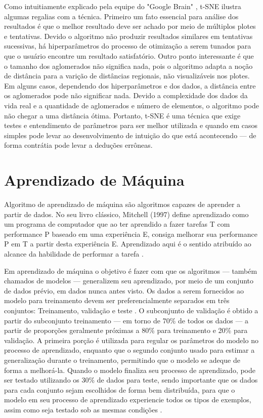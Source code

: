 \documentclass[12pt]{report}
\begin{document}
Como intuitiamente explicado pela equipe do "Google Brain" \cite{distill}, t-SNE ilustra algumas regalias com a técnica. Primeiro um fato essencial para análise dos resultados é que o melhor resultado deve ser achado por meio de múltiplos plotes e tentativas. Devido o algoritmo não produzir resultados similares em tentativas sucessivas, há hiperparâmetros do processo de otimização a serem tunados para que o usuário encontre um resultado satisfatório. Outro ponto interessante é que o tamanho dos aglomerados não significa nada, pois o algoritmo adapta a noção de distância para a varição de distâncias regionais, não visualizáveis nos plotes. Em alguns casos, dependendo dos hiperparâmetros e dos dados, a distância entre os aglomerados pode não significar nada. Devido a complexidade dos dados da vida real e a quantidade de aglomerados e número de elementos, o algoritmo pode não chegar a uma distância ótima. Portanto, t-SNE é uma técnica que exige testes e entendimento de parâmetros para ser melhor utilizada e quando em casos simples pode levar ao desenvolvimento de intuição do que está acontecendo ---  de forma contrátia pode levar a deduções errôneas.

\section{Aprendizado de Máquina}

Algoritmo de aprendizado de máquina são algoritmos capazes de aprender a partir de dados. No seu livro clássico, Mitchell (1997) define aprendizado como um programa de computador que ao ter aprendido a fazer tarefas T com performance P baseado em uma experiência E, consiga melhorar sua performance P em T a partir desta experiência E. Aprendizado aqui é o sentido atribuído ao alcance da habilidade de performar a tarefa \cite{Goodfellow}.

Em aprendizado de máquina o objetivo é fazer com que os algoritmos --- também chamados de modelos --- generalizem seu aprendizado, por meio de um conjunto de dados prévio, em dados nunca antes visto. Os dados a serem fornecidos ao modelo para treinamento devem ser preferencialmente separados em três conjuntos: Treinamento, validação e teste \cite{chollet}. O subconjunto de validação é obtido a partir do subconjunto treinamento --- em torno de 70\% de todos os dados ---  a partir de proporções geralmente próximas a 80\% para treinamento e 20\% para validação. A primeira porção é utilizada para regular os parâmetros do modelo no processo de aprendizado, enquanto que o segundo conjunto usado para estimar a generalização durante o treinamento, permitindo que o modelo se adeque de forma a melhorá-la. Quando o modelo finaliza seu processo de aprendizado, pode ser testado utilizando os 30\% de dados para teste, sendo importante que os dados para cada conjunto sejam escolhidos de forma bem distribuída, para que o modelo em seu processo de aprendizado experiencie todos os tipos de exemplos, assim como seja testado sob as mesmas condições \cite{Goodfellow}.  
\end{document}
